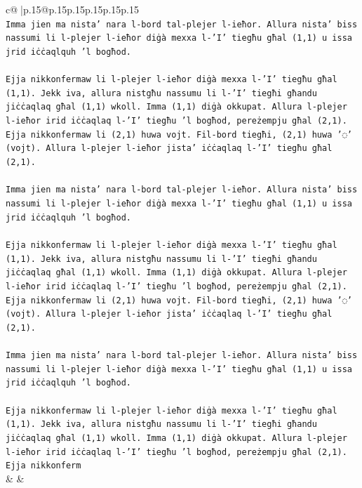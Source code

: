 \documentclass{article}
\begin{document}
{\begin{supertabular}{c@{$\;$}|p{.15\linewidth}@{}p{.15\linewidth}p{.15\linewidth}p{.15\linewidth}p{.15\linewidth}p{.15\linewidth}}
{{{\\ 
\texttt{Imma jien ma nista' nara l{-}bord tal{-}plejer l{-}ieħor. Allura nista' biss nassumi li l{-}plejer l{-}ieħor diġà mexxa l{-}'I' tiegħu għal (1,1) u issa jrid iċċaqlquh 'l bogħod.} \\
\\ 
\texttt{Ejja nikkonfermaw li l{-}plejer l{-}ieħor diġà mexxa l{-}'I' tiegħu għal (1,1). Jekk iva, allura nistgħu nassumu li l{-}'I' tiegħi għandu jiċċaqlaq għal (1,1) wkoll. Imma (1,1) diġà okkupat. Allura l{-}plejer l{-}ieħor irid iċċaqlaq l{-}'I' tiegħu 'l bogħod, pereżempju għal (2,1). Ejja nikkonfermaw li (2,1) huwa vojt. Fil{-}bord tiegħi, (2,1) huwa '◌' (vojt). Allura l{-}plejer l{-}ieħor jista' iċċaqlaq l{-}'I' tiegħu għal (2,1).} \\
\\ 
\texttt{Imma jien ma nista' nara l{-}bord tal{-}plejer l{-}ieħor. Allura nista' biss nassumi li l{-}plejer l{-}ieħor diġà mexxa l{-}'I' tiegħu għal (1,1) u issa jrid iċċaqlquh 'l bogħod.} \\
\\ 
\texttt{Ejja nikkonfermaw li l{-}plejer l{-}ieħor diġà mexxa l{-}'I' tiegħu għal (1,1). Jekk iva, allura nistgħu nassumu li l{-}'I' tiegħi għandu jiċċaqlaq għal (1,1) wkoll. Imma (1,1) diġà okkupat. Allura l{-}plejer l{-}ieħor irid iċċaqlaq l{-}'I' tiegħu 'l bogħod, pereżempju għal (2,1). Ejja nikkonfermaw li (2,1) huwa vojt. Fil{-}bord tiegħi, (2,1) huwa '◌' (vojt). Allura l{-}plejer l{-}ieħor jista' iċċaqlaq l{-}'I' tiegħu għal (2,1).} \\
\\ 
\texttt{Imma jien ma nista' nara l{-}bord tal{-}plejer l{-}ieħor. Allura nista' biss nassumi li l{-}plejer l{-}ieħor diġà mexxa l{-}'I' tiegħu għal (1,1) u issa jrid iċċaqlquh 'l bogħod.} \\
\\ 
\texttt{Ejja nikkonfermaw li l{-}plejer l{-}ieħor diġà mexxa l{-}'I' tiegħu għal (1,1). Jekk iva, allura nistgħu nassumu li l{-}'I' tiegħi għandu jiċċaqlaq għal (1,1) wkoll. Imma (1,1) diġà okkupat. Allura l{-}plejer l{-}ieħor irid iċċaqlaq l{-}'I' tiegħu 'l bogħod, pereżempju għal (2,1). Ejja nikkonferm} \\
            }
        }
    }
    & & \\ \\


\end{supertabular}}
\end{document}

